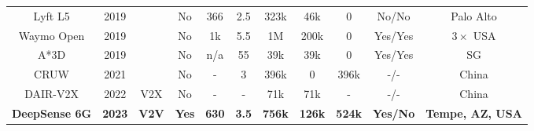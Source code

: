 \documentclass[10pt,comsoc]{IEEEtran}
\begin{document}
\begin{table}[!t]
{\begin{tabular}{|c|c|c|c|c|c|c|c|c|c|c|}
	Lyft L5\cite{houston2020thousand}               & 2019          &                                                                                 & No                                                        & 366       & 2.5       & 323k                                                  & 46k                                                  & 0                                                    & No/No      & Palo Alto               \\ \cline{1-2} \cline{4-11} 
	Waymo Open\cite{llc2019waymo}            & 2019          &                                                                                 & No                                                        & 1k        & 5.5       & 1M                                                    & 200k                                                 & 0                                                    & Yes/Yes    & $3 \times$ USA          \\ \cline{1-2} \cline{4-11} 
	A*3D \cite{pham20203d}                 & 2019          &                                                                                 & No                                                        & n/a       & 55        & 39k                                                   & 39k                                                  & 0                                                    & Yes/Yes    & SG                      \\ \cline{1-2} \cline{4-11} 
	CRUW \cite{wang2021rethinking}                 & 2021          &                                                                                 & No                                                        & -        & 3         & 396k                                                  & 0                                                    & 396k                                                 & -/-          & China                   \\ \hline \hline
	DAIR-V2X \cite{yu2022dair}             & 2022          & V2X                                                                             & No                                                        & -         & -         & 71k                                                   & 71k                                                  & -                                                    & -/-          & China                   \\ \hline
	\textbf{DeepSense 6G} & \textbf{2023} & \textbf{V2V}                                                                    & \textbf{Yes}                                              & \textbf{630} & \textbf{3.5} & \textbf{756k}                                             & \textbf{126k}                                            & \textbf{524k}                                            & \textbf{Yes/No}  & \textbf{Tempe, AZ, USA} \\ \hline
	\end{tabular}%
}
	\label{tab:literature_review}
\end{table}
\end{document}
